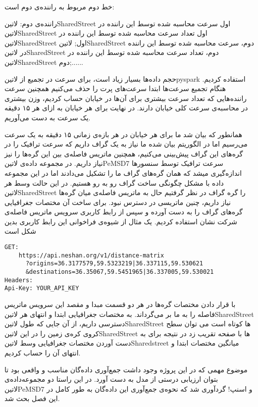 خط دوم مربوط به راننده‌ی دوم است:

راننده‌ی دوم: ‌لاتین{SharedStreet} اول سرعت محاسبه شده توسط این راننده در ‌لاتین{SharedStreet} اول تعداد سرعت محاسبه شده توسط این راننده در ‌لاتین{SharedStreet} اول;  ‌لاتین{SharedStreet} دوم، سرعت محاسبه شده توسط این راننده در ‌لاتین{SharedStreet} دوم، تعداد سرعت محاسبه شده توسط این راننده در ‌لاتین{SharedStreet} دوم;......

حجم داده‌ها بسیار زیاد است، برای سرعت در تجمیع از ‌لاتین{pyspark} استفاده کردیم. هنگام تجمیع سرعت‌ها ابتدا سرعت‌های پرت را حذف می‌کنیم همچنین سرعت راننده‌هایی که تعداد سرعت بیشتری برای آن‌ها در خیابان حساب کردیم، وزن بیشتری در محاسبه‌ی سرعت کلی خیابان دارند. در نهایت برای هر خیابان به ازای هر ۱۵ دقیقه یک سرعت به دست می‌آوریم.


همانطور که بیان شد ما برای هر خیابان در هر بازه‌ی زمانی ۱۵ دقیقه به یک سرعت می‌رسیم اما در الگوریتم بیان شده ما نیاز به یک گراف داریم که سرعت ترافیک را در گره‌های این گراف پیش‌بینی می‌کنیم، همچنین ماتریس فاصله‌ی بین این گره‌ها را نیز نیاز داریم. در مجموعه داده‌ی ‌لاتین{PeMSD7} سرعت ترافیک توسط سنسورها اندازه‌گیری میشد که همان گره‌های گراف ما را تشکیل می‌دادند اما در این مجموعه داده با مشکل چگونگی ساخت گراف رو به رو هستیم. در این حالت وسط هر ‌لاتین{SharedStreet} را گره گراف در نظر گرفتیم حال به ماتریس فاصله‌ی میان گره‌ها نیاز داریم، چنین ماتریسی در دسترس نبود. برای ساخت آن مختصات جغرافیایی گره‌های گراف را به دست آورده و سپس از رابط کاربری سرویس ماتریس فاصله‌ی شرکت نشان استفاده کردیم. یک مثال از شیوه‌ی فراخوانی این رابط کاربری بدین شکل است

\begin{latin}\begin{lstlisting}
GET:
    https://api.neshan.org/v1/distance-matrix
      ?origins=36.3177579,59.5323219|36.337115,59.530621
      &destinations=36.35067,59.5451965|36.337005,59.530021
Headers:
Api-Key: YOUR_API_KEY
\end{lstlisting}\end{latin}

با قرار دادن مختصات گره‌ها در هر دو قسمت مبدا و مقصد این سرویس ماتریس فاصله را به ما بر می‌گرداند. به مختصات جغرافیایی ابتدا و انتهای هر ‌لاتین{SharedStreet} دسترسی داریم، از آن جایی که طول ‌لاتین{SharedStreet} ها کوتاه است می توان سطح کروی کره‌ی زمین را در این ‌لاتین{SharedStreet} ها با صفحه تقریب زد در نتیجه برای به دست آوردن مختصات جغرافیایی وسط ‌لاتین{Sharedstreet} میانگین مختصات ابتدا و انتهای آن را حساب کردیم.

موضوع مهمی که در این پروژه وجود داشت جمع‌آوری داده‌گان مناسب و واقعی بود تا بتوان ارزیابی درستی از مدل به دست آورد. در این راستا دو مجموعه‌داده‌ی ‌لاتین{PeMSD7} و اسنپ! گرد‌آوری شد که نحوه‌ی جمع‌آوری این داده‌گان به طور کامل در این فصل بحث شد.
